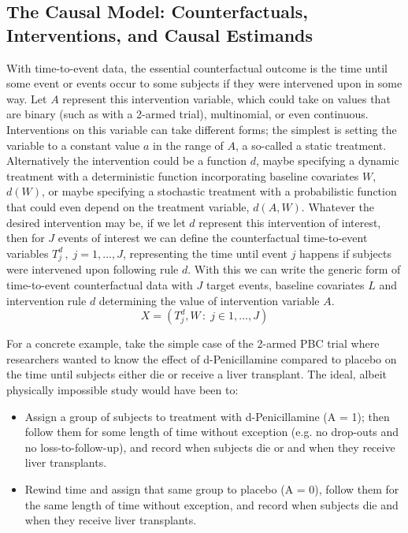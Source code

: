 \documentclass{report}
\newcommand{\1}{\ensuremath{\mathbf{1}}}
\renewcommand{\L}{\ensuremath{W}}
\begin{document}
\subsection{The Causal Model: Counterfactuals, Interventions, and Causal Estimands}
\label{sec:org848b0a8}
With time-to-event data, the essential counterfactual outcome is the time until some event or events occur to some subjects if they were intervened upon in some way. Let \(A\) represent this intervention variable, which could take on values that are binary (such as with a 2-armed trial), multinomial, or even continuous. Interventions on this variable can take different forms; the simplest is setting the variable to a constant value \(a\) in the range of \(A\), a so-called a static treatment. Alternatively the intervention could be a function \(d\), maybe specifying a dynamic treatment with a deterministic function incorporating baseline covariates \(\L\), \(d(\L)\), or maybe specifying a stochastic treatment with a probabilistic function that could even depend on the treatment variable, \(d(A, \L)\). Whatever the desired intervention may be, if we let \(d\) represent this intervention of interest, then for \(J\) events of interest we can define the counterfactual time-to-event variables \(T^d_j \,,\; j = 1, ..., J\), representing the time until event \(j\) happens if subjects were intervened upon following rule \(d\). With this we can write the generic form of time-to-event counterfactual data with \(J\) target events, baseline covariates \(L\) and intervention rule \(d\) determining the value of intervention variable \(A\).
\[ X = \left( T^d_j, \L \,:\; j \in 1, \dots, J \right)\]

For a concrete example, take the simple case of the 2-armed PBC trial where researchers wanted to know the effect of d-Penicillamine compared to placebo on the time until subjects either die or receive a liver transplant. The ideal, albeit physically impossible study would have been to:
\begin{itemize}
\item Assign a group of subjects to treatment with d-Penicillamine (A = 1); then follow them for some length of time without exception (e.g. no drop-outs and no loss-to-follow-up), and record when subjects die or and when they receive liver transplants.
\item Rewind time and assign that same group to placebo (A = 0), follow them for the same length of time without exception, and record when subjects die and when they receive liver transplants.
\end{itemize}
\end{document}
